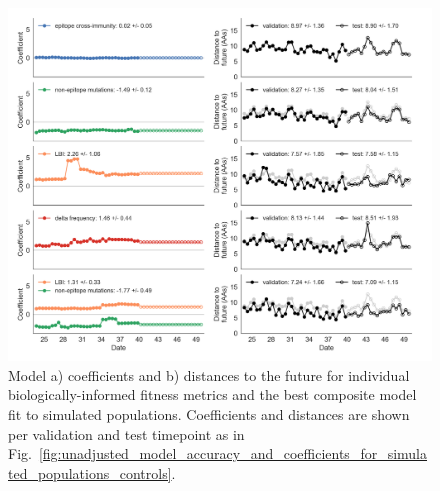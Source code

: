 \begin{figure}[ht!]
  \begin{center}
  \includegraphics[width=\textwidth]{figures/unadjusted-model-accuracy-and-coefficients-for-simulated-populations.png}
  \caption{
    Model a) coefficients and b) distances to the future for individual biologically-informed fitness metrics and the best composite model fit to simulated populations.
    Coefficients and distances are shown per validation and test timepoint as in Fig.~\ref{fig:unadjusted_model_accuracy_and_coefficients_for_simulated_populations_controls}.
  }
  \label{fig:unadjusted_model_accuracy_and_coefficients_for_simulated_populations}
  \end{center}
\end{figure}

